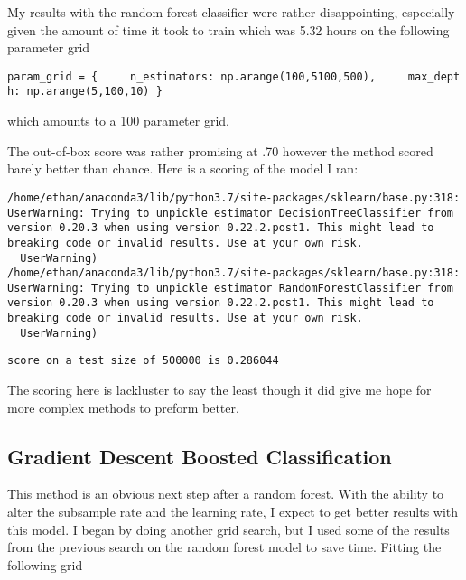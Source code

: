 \documentclass[11pt]{article}
\begin{document}
    My results with the random forest classifier were rather disappointing,
especially given the amount of time it took to train which was 5.32
hours on the following parameter grid

\texttt{param\_grid\ =\ \{\ \ \ \ \ \textquotesingle{}n\_estimators\textquotesingle{}:\ np.arange(100,5100,500),\ \ \ \ \ \textquotesingle{}max\_depth\textquotesingle{}:\ np.arange(5,100,10)\ \}}

which amounts to a 100 parameter grid.

The out-of-box score was rather promising at .70 however the method
scored barely better than chance. Here is a scoring of the model I ran:

    \begin{Verbatim}[commandchars=\\\{\}]
/home/ethan/anaconda3/lib/python3.7/site-packages/sklearn/base.py:318: UserWarning: Trying to unpickle estimator DecisionTreeClassifier from version 0.20.3 when using version 0.22.2.post1. This might lead to breaking code or invalid results. Use at your own risk.
  UserWarning)
/home/ethan/anaconda3/lib/python3.7/site-packages/sklearn/base.py:318: UserWarning: Trying to unpickle estimator RandomForestClassifier from version 0.20.3 when using version 0.22.2.post1. This might lead to breaking code or invalid results. Use at your own risk.
  UserWarning)

    \end{Verbatim}

    \begin{Verbatim}[commandchars=\\\{\}]
score on a test size of 500000 is 0.286044

    \end{Verbatim}

    The scoring here is lackluster to say the least though it did give me
hope for more complex methods to preform better.

\hypertarget{gradient-descent-boosted-classification}{%
\subsection{Gradient Descent Boosted
Classification}\label{gradient-descent-boosted-classification}}

This method is an obvious next step after a random forest. With the
ability to alter the subsample rate and the learning rate, I expect to
get better results with this model. I began by doing another grid
search, but I used some of the results from the previous search on the
random forest model to save time. Fitting the following grid
\end{document}
